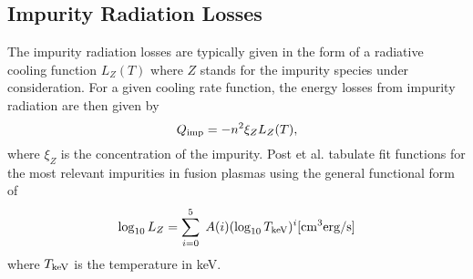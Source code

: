 \documentclass[amsmath,amssymb,a4]{revtex4-2}
\begin{document}
\subsection{Impurity Radiation Losses}

The impurity radiation losses are typically given in the form of a radiative cooling function $L_Z(T)$ where $Z$ stands for the impurity species under consideration. For a given cooling rate function, the energy losses from impurity radiation are then given by
\begin{equation}\label{impurity_radiation}
    Q_{\rm imp} = - n^2 \xi_Z L_Z(T),
\end{equation}
where $\xi_Z$ is the concentration of the impurity. Post et al.\cite{post1977} tabulate fit functions for the most relevant impurities in fusion plasmas using the general functional form of \cite{post1977}
\begin{equation}\label{cooling_rate}
    \log_{10} L_Z = \sum_{i=0}^5 \; A(i) (\log_{10} T_{\rm keV})^i [{\rm cm}^3 {\rm erg/s}]
\end{equation}
where $T_{\rm keV}$ is the temperature in keV.
\end{document}
